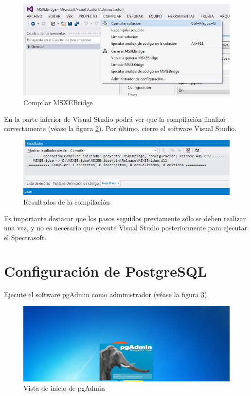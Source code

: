 \begin{figure}[H]
  \centering
  \includegraphics[width=1\linewidth]{./img/vs-compilar-solucion.jpg}
\caption[]{Compilar MSXEBridge\label{fig:vs-compilar-solucion}}
\end{figure}

En la parte inferior de Visual Studio podr\'{a} ver que la compilaci\'{o}n finaliz\'{o} correctamente (v\'{e}ase la figura \ref{fig:vs-resultados}). Por \'{u}ltimo, cierre el software Visual Studio.

\begin{figure}[H]
  \centering
  \includegraphics[width=1\linewidth]{./img/vs-resultados.jpg}
\caption[]{Resultados de la compilaci\'{o}n\label{fig:vs-resultados}}
\end{figure}

Es importante destacar que los pasos seguidos previamente s\'{o}lo se deben realizar una vez, y no es necesario que ejecute Visual Studio posteriormente para ejecutar el Spectrasoft.

\newpage

\section*{Configuraci\'{o}n de PostgreSQL}
	
Ejecute el software pgAdmin como administrador (v\'{e}ase la figura \ref{fig:pgadmin-inicio}).
	
\begin{figure}[H]
  \centering
  \includegraphics[width=1\linewidth]{./img/pgadmin-inicio.jpg}
\caption[]{Vista de inicio de pgAdmin\label{fig:pgadmin-inicio}}
\end{figure}

